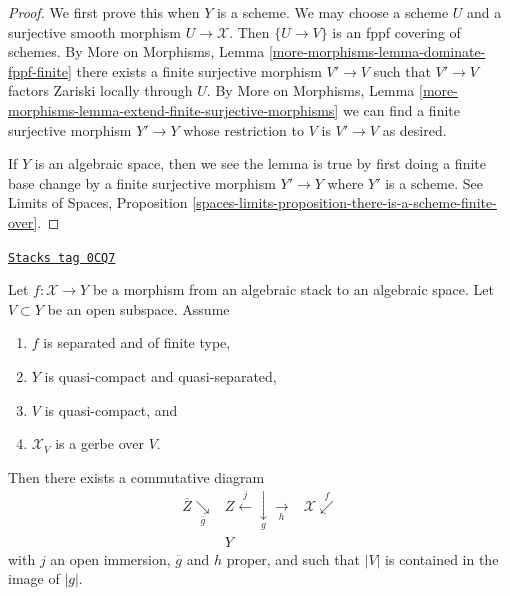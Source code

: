 \begin{proof}
We first prove this when $Y$ is a scheme.
We may choose a scheme $U$ and a surjective smooth morphism
$U \to \mathcal{X}$. Then $\{U \to V\}$ is an fppf covering of schemes.
By More on Morphisms, Lemma \ref{more-morphisms-lemma-dominate-fppf-finite}
there exists a finite surjective morphism
$V' \to V$ such that $V' \to V$ factors Zariski locally
through $U$. By
More on Morphisms, Lemma
\ref{more-morphisms-lemma-extend-finite-surjective-morphisms}
we can find a finite surjective morphism $Y' \to Y$
whose restriction to $V$ is $V' \to V$ as desired.

\medskip\noindent
If $Y$ is an algebraic space, then we see the lemma is true by
first doing a finite base change by a finite surjective morphism
$Y' \to Y$ where $Y'$ is a scheme. See
Limits of Spaces, Proposition
\ref{spaces-limits-proposition-there-is-a-scheme-finite-over}.
\end{proof}

\begin{lemma}
\label{stacks-more-morphisms-lemma-make-section}
\href{https://stacks.math.columbia.edu/tag/0CQ7}{\texttt{Stacks tag 0CQ7}}

Let $f : \mathcal{X} \to Y$ be a morphism from an algebraic stack
to an algebraic space. Let $V \subset Y$ be an open subspace.
Assume
\begin{enumerate}
\item $f$ is separated and of finite type,
\item $Y$ is quasi-compact and quasi-separated,
\item $V$ is quasi-compact, and
\item $\mathcal{X}_V$ is a gerbe over $V$.
\end{enumerate}
Then there exists a commutative diagram
$$
\begin{array}{ccc}\overline{Z} \underset{\overline{g}}{\searrow} & Z \overset{j}{\longleftarrow}\underset{g}{\downarrow}\underset{h}{\longrightarrow} & \mathcal{X} \overset{f}{\swarrow} \\  & Y & \end{array}
$$
with $j$ an open immersion, $\overline{g}$ and $h$ proper,
and such that $|V|$ is contained in the image of $|g|$.
\end{lemma}

